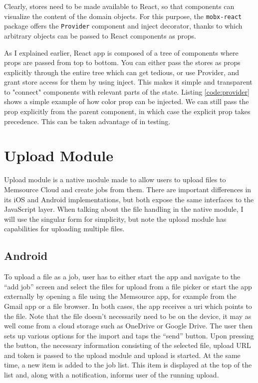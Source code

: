 Clearly, stores need to be made available to React, so that components can visualize the content of the domain objects. For this purpose, the \texttt{mobx-react} package offers the \texttt{Provider} component and inject decorator, thanks to which arbitrary objects can be passed to React components as props. 

As I explained earlier, React app is composed of a tree of components where props are passed from top to bottom. You can either pass the stores as props explicitly through the entire tree which can get tedious, or use Provider, and grant store access for them by using inject. This makes it simple and transparent to "connect" components with relevant parts of the state. Listing \ref{code:provider} shows a simple example of how color prop can be injected. We can still pass the prop explicitly from the parent component, in which case the explicit prop takes precedence. This can be taken advantage of in testing.




\section{Upload Module}
Upload module is a native module made to allow users to upload files to Memsource Cloud and create jobs from them. There are important differences in its iOS and Android implementations, but both expose the same interfaces to the JavaScript layer. When talking about the file handling in the native module, I will use the singular form for simplicity, but note the upload module has capabilities for uploading multiple files.


\subsection{Android}
To upload a file as a job, user has to either start the app and navigate to the “add job” screen and select the files for upload from a file picker or start the app externally by opening a file using the Memsource app, for example from the Gmail app or a file browser. 
In both cases, the app receives a uri which points to the file. Note that the file doesn't necessarily need to be on the device, it may as well come from a cloud storage such as OneDrive or Google Drive. The user then sets up various options for the import and taps the “send” button. 
Upon pressing the button, the necessary information consisting of the selected file, upload URL and token is passed to the upload module and upload is started. At the same time, a new item is added to the job list. This item is displayed at the top of the list and, along with a notification, informs user of the running upload.


